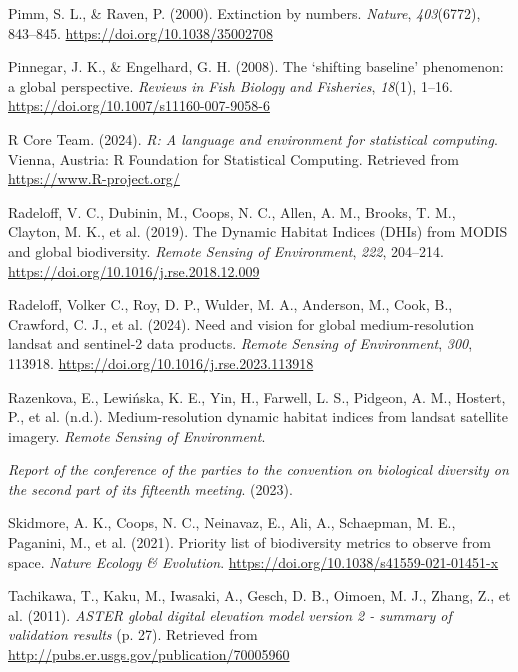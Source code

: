 \documentclass[
]{agujournal2019}
\newlength{\cslhangindent}
\newenvironment{CSLReferences}[2] %
 {\begin{list}{}{%
  \setlength{\itemindent}{0pt}
  \setlength{\leftmargin}{0pt}
  \setlength{\parsep}{0pt}
  \ifodd #1
   \setlength{\leftmargin}{\cslhangindent}
   \setlength{\itemindent}{-1\cslhangindent}
  \fi
  \setlength{\itemsep}{#2\baselineskip}}}
 {\end{list}}
\begin{document}
\begin{CSLReferences}{1}{0}
Pimm, S. L., \& Raven, P. (2000). Extinction by numbers. \emph{Nature},
\emph{403}(6772), 843--845. \url{https://doi.org/10.1038/35002708}

Pinnegar, J. K., \& Engelhard, G. H. (2008). The {`}shifting baseline{'}
phenomenon: a global perspective. \emph{Reviews in Fish Biology and
Fisheries}, \emph{18}(1), 1--16.
\url{https://doi.org/10.1007/s11160-007-9058-6}

R Core Team. (2024). \emph{R: A language and environment for statistical
computing}. Vienna, Austria: R Foundation for Statistical Computing.
Retrieved from \url{https://www.R-project.org/}

Radeloff, V. C., Dubinin, M., Coops, N. C., Allen, A. M., Brooks, T. M.,
Clayton, M. K., et al. (2019). The Dynamic Habitat Indices (DHIs) from
MODIS and global biodiversity. \emph{Remote Sensing of Environment},
\emph{222}, 204--214. \url{https://doi.org/10.1016/j.rse.2018.12.009}

Radeloff, Volker C., Roy, D. P., Wulder, M. A., Anderson, M., Cook, B.,
Crawford, C. J., et al. (2024). Need and vision for global
medium-resolution landsat and sentinel-2 data products. \emph{Remote
Sensing of Environment}, \emph{300}, 113918.
\url{https://doi.org/10.1016/j.rse.2023.113918}

Razenkova, E., Lewińska, K. E., Yin, H., Farwell, L. S., Pidgeon, A. M.,
Hostert, P., et al. (n.d.). Medium-resolution dynamic habitat indices
from landsat satellite imagery. \emph{Remote Sensing of Environment}.

\emph{Report of the conference of the parties to the convention on
biological diversity on the second part of its fifteenth meeting}.
(2023).

Skidmore, A. K., Coops, N. C., Neinavaz, E., Ali, A., Schaepman, M. E.,
Paganini, M., et al. (2021). Priority list of biodiversity metrics to
observe from space. \emph{Nature Ecology \& Evolution}.
\url{https://doi.org/10.1038/s41559-021-01451-x}

Tachikawa, T., Kaku, M., Iwasaki, A., Gesch, D. B., Oimoen, M. J.,
Zhang, Z., et al. (2011). \emph{ASTER global digital elevation model
version 2 - summary of validation results} (p. 27). Retrieved from
\url{http://pubs.er.usgs.gov/publication/70005960}


\end{CSLReferences}
\end{document}
